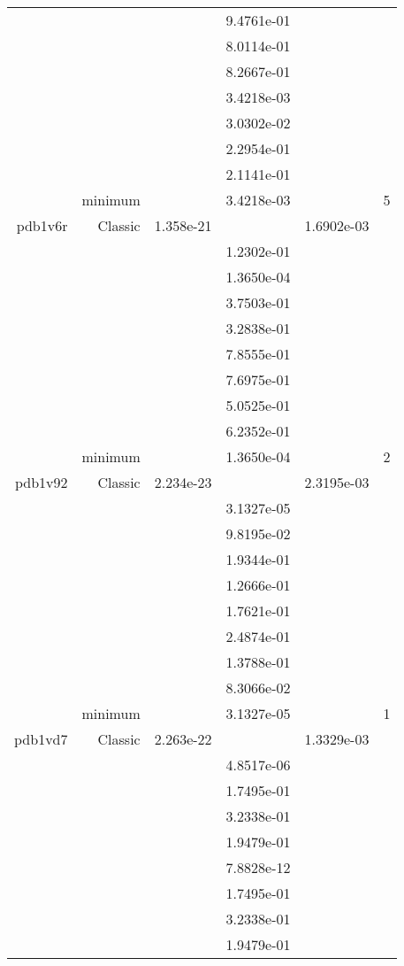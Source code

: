 \begin{xltabular}{\textwidth}{r|rS[table-format=1.3e+2]S[table-format=1.4e+2]S[table-format=1.4e+2]S[table-format=-1.5]}
&  &  & 9.4761e-01 & & \\
&  &  & 8.0114e-01 & & \\
&  &  & 8.2667e-01 & & \\
&  &  & 3.4218e-03 & & \\
&  &  & 3.0302e-02 & & \\
&  &  & 2.2954e-01 & & \\
&  &  & 2.1141e-01 & & \\
& minimum &  & 3.4218e-03 & & 5 \\  \addlinespace
pdb1v6r & Classic & 1.358e-21 &  & 1.6902e-03 & \\
&  &  & 1.2302e-01 & & \\
&  &  & 1.3650e-04 & & \\
&  &  & 3.7503e-01 & & \\
&  &  & 3.2838e-01 & & \\
&  &  & 7.8555e-01 & & \\
&  &  & 7.6975e-01 & & \\
&  &  & 5.0525e-01 & & \\
&  &  & 6.2352e-01 & & \\
& minimum &  & 1.3650e-04 & & 2 \\  \addlinespace
pdb1v92 & Classic & 2.234e-23 &  & 2.3195e-03 & \\
&  &  & 3.1327e-05 & & \\
&  &  & 9.8195e-02 & & \\
&  &  & 1.9344e-01 & & \\
&  &  & 1.2666e-01 & & \\
&  &  & 1.7621e-01 & & \\
&  &  & 2.4874e-01 & & \\
&  &  & 1.3788e-01 & & \\
&  &  & 8.3066e-02 & & \\
& minimum &  & 3.1327e-05 & & 1 \\  \addlinespace
pdb1vd7 & Classic & 2.263e-22 &  & 1.3329e-03 & \\
&  &  & 4.8517e-06 & & \\
&  &  & 1.7495e-01 & & \\
&  &  & 3.2338e-01 & & \\
&  &  & 1.9479e-01 & & \\
&  &  & 7.8828e-12 & & \\
&  &  & 1.7495e-01 & & \\
&  &  & 3.2338e-01 & & \\
&  &  & 1.9479e-01 & & \\

\end{xltabular}
